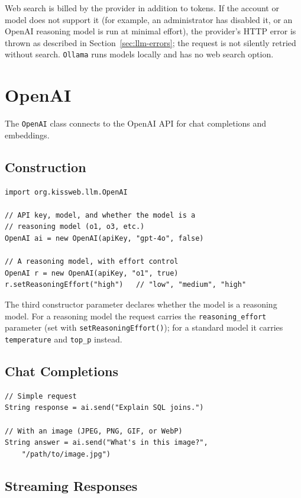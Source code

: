 \noindent
Web search is billed by the provider in addition to tokens.  If the account or model does not support it (for example, an administrator has disabled it, or an OpenAI reasoning model is run at minimal effort), the provider's HTTP error is thrown as described in Section~\ref{sec:llm-errors}; the request is not silently retried without search.  \texttt{Ollama} runs models locally and has no web search option.

\section{OpenAI}
\label{sec:llm-openai}

The \texttt{OpenAI} class connects to the OpenAI API for chat completions and embeddings.

\subsection{Construction}

\begin{lstlisting}[style=groovy]
import org.kissweb.llm.OpenAI

// API key, model, and whether the model is a
// reasoning model (o1, o3, etc.)
OpenAI ai = new OpenAI(apiKey, "gpt-4o", false)

// A reasoning model, with effort control
OpenAI r = new OpenAI(apiKey, "o1", true)
r.setReasoningEffort("high")   // "low", "medium", "high"
\end{lstlisting}

\noindent
The third constructor parameter declares whether the model is a reasoning model.  For a reasoning model the request carries the \texttt{reasoning\_effort} parameter (set with \texttt{setReasoningEffort()}); for a standard model it carries \texttt{temperature} and \texttt{top\_p} instead.

\subsection{Chat Completions}

\begin{lstlisting}[style=groovy]
// Simple request
String response = ai.send("Explain SQL joins.")

// With an image (JPEG, PNG, GIF, or WebP)
String answer = ai.send("What's in this image?",
    "/path/to/image.jpg")
\end{lstlisting}

\subsection{Streaming Responses}

